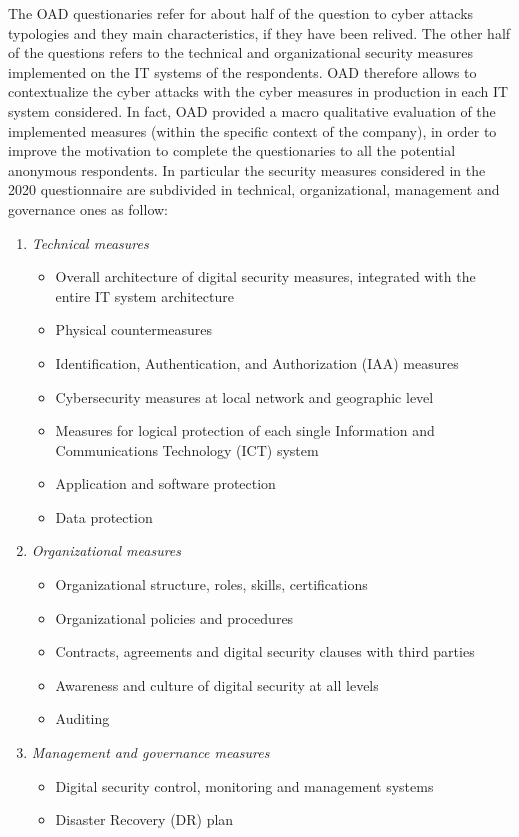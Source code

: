 \documentclass{easychair}
\begin{document}
The OAD questionaries refer for about half of the question to cyber attacks typologies and they main characteristics, if they have been relived. 
The other half of the questions refers to the technical and organizational security measures implemented on the IT systems of the respondents. 
OAD therefore allows to contextualize the cyber attacks with the cyber measures in production in each IT system considered. 
In fact, OAD provided a macro qualitative evaluation of the implemented measures (within the specific context of the company), in order to improve the motivation to 
complete the questionaries to all the potential anonymous respondents. 
In particular the security measures considered in the 2020 questionnaire are subdivided in technical, organizational, management and governance ones as follow:
\begin{enumerate}
\small
	\item \emph{Technical measures}
	\begin{itemize}
		\item Overall architecture of digital security measures, integrated with the entire IT system architecture
		\item Physical countermeasures
		\item Identification, Authentication, and Authorization (IAA) measures
		\item Cybersecurity measures at local network and geographic level
		\item Measures for logical protection of each single Information and Communications Technology (ICT) system
		\item Application and software protection
		\item Data protection
	\end{itemize}
	\item \emph{Organizational measures}
	\begin{itemize}
		\item Organizational structure, roles, skills, certifications
		\item Organizational policies and procedures
		\item Contracts, agreements and digital security clauses with third parties
		\item Awareness and culture of digital security at all levels
		\item Auditing
	\end{itemize}
	\item \emph{Management and governance measures}
	\begin{itemize}
		\item Digital security control, monitoring and management systems
		\item Disaster Recovery (DR) plan
	\end{itemize}
\end{enumerate}
\end{document}
